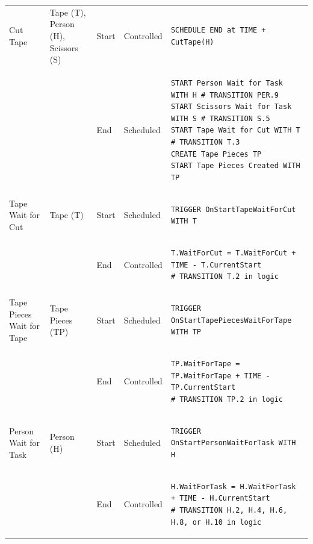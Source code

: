 \documentclass[
  10pt,
  a4paperpaper,
  DIV=11,
  numbers=noendperiod,
  oneside]{scrreprt}
\begin{document}
\begin{longtable}{@{}>{\raggedright\arraybackslash}p{1.8cm}>{\raggedright\arraybackslash}p{2.1cm}>{\raggedright\arraybackslash}p{0.9cm}>{\raggedright\arraybackslash}p{2.2cm}>{\raggedright\arraybackslash}p{8.75cm}@{}}
  Cut Tape                  & Tape (T), Person (H), Scissors (S)      & Start & Controlled  & 
\begin{lstlisting}[language=CMPseudo]
SCHEDULE END at TIME + CutTape(H)
\end{lstlisting}             \\
  &                                                          & End   & Scheduled & 
\begin{lstlisting}[language=CMPseudo]
START Person Wait for Task WITH H # TRANSITION PER.9
START Scissors Wait for Task WITH S # TRANSITION S.5
START Tape Wait for Cut WITH T # TRANSITION T.3
CREATE Tape Pieces TP
START Tape Pieces Created WITH TP
\end{lstlisting}             \\ \midrule
  Tape Wait for Cut         & Tape (T)                                & Start & Scheduled  & 
\begin{lstlisting}[language=CMPseudo]
TRIGGER OnStartTapeWaitForCut WITH T
\end{lstlisting}             \\
  &                                                          & End   & Controlled & 
\begin{lstlisting}[language=CMPseudo]
T.WaitForCut = T.WaitForCut + TIME - T.CurrentStart
# TRANSITION T.2 in logic
\end{lstlisting}             \\ \midrule
  Tape Pieces Wait for Tape & Tape Pieces (TP)                       & Start & Scheduled  & 
\begin{lstlisting}[language=CMPseudo]
TRIGGER OnStartTapePiecesWaitForTape WITH TP
\end{lstlisting}             \\
  &                                                          & End   & Controlled & 
\begin{lstlisting}[language=CMPseudo]
TP.WaitForTape = TP.WaitForTape + TIME - TP.CurrentStart
# TRANSITION TP.2 in logic
\end{lstlisting}             \\ \midrule
  Person Wait for Task      & Person (H)                              & Start & Scheduled  & 
\begin{lstlisting}[language=CMPseudo]
TRIGGER OnStartPersonWaitForTask WITH H
\end{lstlisting}             \\
  &                                                          & End   & Controlled & 
\begin{lstlisting}[language=CMPseudo]
H.WaitForTask = H.WaitForTask + TIME - H.CurrentStart
# TRANSITION H.2, H.4, H.6, H.8, or H.10 in logic
\end{lstlisting}             \\ \bottomrule
  

\end{longtable}
\end{document}
